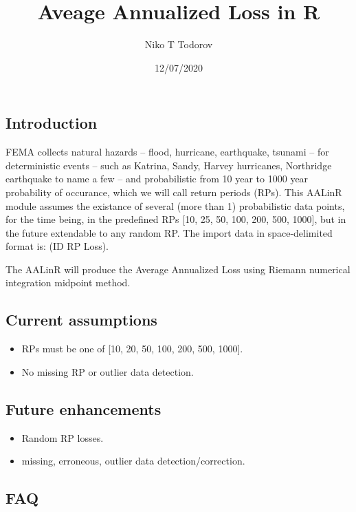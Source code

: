 \documentclass[
]{article}
\title{Aveage Annualized Loss in R}
\author{Niko T Todorov}
\date{12/07/2020}
\providecommand{\tightlist}{%
  \setlength{\itemsep}{0pt}\setlength{\parskip}{0pt}}
\begin{document}
\maketitle

\hypertarget{introduction}{%
\subsection{Introduction}\label{introduction}}

FEMA collects natural hazards -- flood, hurricane, earthquake, tsunami
-- for deterministic events -- such as Katrina, Sandy, Harvey
hurricanes, Northridge earthquake to name a few -- and probabilistic
from 10 year to 1000 year probability of occurance, which we will call
return periods (RPs). This AALinR module assumes the existance of
several (more than 1) probabilistic data points, for the time being, in
the predefined RPs {[}10, 25, 50, 100, 200, 500, 1000{]}, but in the
future extendable to any random RP. The import data in space-delimited
format is: (ID RP Loss).

The AALinR will produce the Average Annualized Loss using Riemann
numerical integration midpoint method.

\hypertarget{current-assumptions}{%
\subsection{Current assumptions}\label{current-assumptions}}

\begin{itemize}
\tightlist
\item
  RPs must be one of {[}10, 20, 50, 100, 200, 500, 1000{]}.
\item
  No missing RP or outlier data detection.
\end{itemize}

\hypertarget{future-enhancements}{%
\subsection{Future enhancements}\label{future-enhancements}}

\begin{itemize}
\tightlist
\item
  Random RP losses.
\item
  missing, erroneous, outlier data detection/correction.
\end{itemize}

\hypertarget{faq}{%
\subsection{FAQ}\label{faq}}
\end{document}
